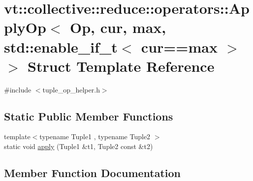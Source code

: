 \hypertarget{structvt_1_1collective_1_1reduce_1_1operators_1_1_apply_op_3_01_op_00_01cur_00_01max_00_01std_1_2d6ca6d223c0efb94ecae2d0b534fc8c}{}\section{vt\+:\+:collective\+:\+:reduce\+:\+:operators\+:\+:Apply\+Op$<$ Op, cur, max, std\+:\+:enable\+\_\+if\+\_\+t$<$ cur==max $>$ $>$ Struct Template Reference}
\label{structvt_1_1collective_1_1reduce_1_1operators_1_1_apply_op_3_01_op_00_01cur_00_01max_00_01std_1_2d6ca6d223c0efb94ecae2d0b534fc8c}


{\ttfamily \#include $<$tuple\+\_\+op\+\_\+helper.\+h$>$}

\subsection*{Static Public Member Functions}
\begin{DoxyCompactItemize}
\item 
{\footnotesize template$<$typename Tuple1 , typename Tuple2 $>$ }\\static void \hyperlink{structvt_1_1collective_1_1reduce_1_1operators_1_1_apply_op_3_01_op_00_01cur_00_01max_00_01std_1_2d6ca6d223c0efb94ecae2d0b534fc8c_a666dcb5705928ad7f534df50fb226b90}{apply} (Tuple1 \&t1, Tuple2 const \&t2)
\end{DoxyCompactItemize}


\subsection{Member Function Documentation}
\mbox{\label{structvt_1_1collective_1_1reduce_1_1operators_1_1_apply_op_3_01_op_00_01cur_00_01max_00_01std_1_2d6ca6d223c0efb94ecae2d0b534fc8c_a666dcb5705928ad7f534df50fb226b90}} 

